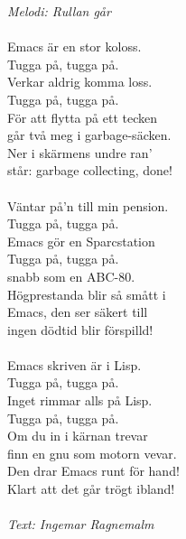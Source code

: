 {\footnotesize\textit{Melodi: Rullan går}}\\
\\
Emacs är en stor koloss.\\
Tugga på, tugga på.\\
Verkar aldrig komma loss.\\
Tugga på, tugga på.\\
För att flytta på ett tecken\\
går två meg i garbage-säcken.\\
Ner i skärmens undre ran’\\
står: garbage collecting, done!\\
\\
Väntar på’n till min pension.\\
Tugga på, tugga på.\\
Emacs gör en Sparcstation\\
Tugga på, tugga på.\\
snabb som en ABC-80.\\
Högprestanda blir så smått i\\
Emacs, den ser säkert till\\
ingen dödtid blir förspilld!\\
\\
Emacs skriven är i Lisp.\\
Tugga på, tugga på.\\
Inget rimmar alls på Lisp.\\
Tugga på, tugga på.\\
Om du in i kärnan trevar\\
finn en gnu som motorn vevar.\\
Den drar Emacs runt för hand!\\
Klart att det går trögt ibland!\\
\\
{\footnotesize\textit{Text: Ingemar Ragnemalm }}
